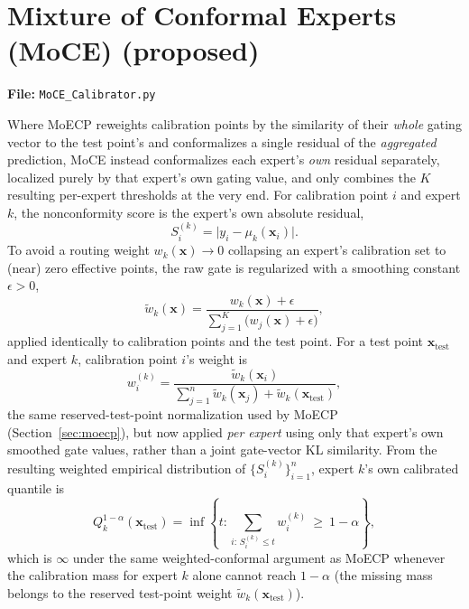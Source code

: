 \documentclass[11pt]{article}
\begin{document}
\section{Mixture of Conformal Experts (MoCE) (proposed)}
\textbf{File:} \texttt{MoCE\_Calibrator.py}

Where MoECP reweights calibration points by the similarity of their \emph{whole} gating vector to
the test point's and conformalizes a single residual of the \emph{aggregated} prediction, MoCE
instead conformalizes each expert's \emph{own} residual separately, localized purely by that
expert's own gating value, and only combines the $K$ resulting per-expert thresholds at the very
end. For calibration point $i$ and expert $k$, the nonconformity score is the expert's own absolute
residual,
\begin{equation}
S_i^{(k)} = \big|y_i - \mu_k(\bm{x}_i)\big|.
\label{eq:moce-score}
\end{equation}
To avoid a routing weight $w_k(\bm{x}) \to 0$ collapsing an expert's calibration set to (near) zero
effective points, the raw gate is regularized with a smoothing constant $\epsilon>0$,
\begin{equation}
\tilde{w}_k(\bm{x}) = \frac{w_k(\bm{x}) + \epsilon}{\sum_{j=1}^{K}\big(w_j(\bm{x})+\epsilon\big)},
\label{eq:moce-smooth}
\end{equation}
applied identically to calibration points and the test point. For a test point
$\bm{x}_{\mathrm{test}}$
and expert $k$, calibration point $i$'s weight is
\begin{equation}
w_i^{(k)} = \frac{\tilde{w}_k(\bm{x}_i)}{\sum_{j=1}^{n} \tilde{w}_k(\bm{x}_j) +
\tilde{w}_k(\bm{x}_{\mathrm{test}})},
\label{eq:moce-weight}
\end{equation}
the same reserved-test-point normalization used by MoECP (Section~\ref{sec:moecp}), but now applied
\emph{per expert} using only that expert's own smoothed gate values, rather than a joint
gate-vector KL similarity. From the resulting weighted empirical distribution of
$\{S_i^{(k)}\}_{i=1}^n$, expert $k$'s own calibrated quantile is
\begin{equation}
Q_k^{1-\alpha}(\bm{x}_{\mathrm{test}}) = \inf\left\{ t : \sum_{i:\, S_i^{(k)} \le t} w_i^{(k)} \
\ge\ 1-\alpha \right\},
\label{eq:moce-quantile}
\end{equation}
which is $\infty$ under the same weighted-conformal argument as MoECP whenever the calibration mass
for expert $k$ alone cannot reach $1-\alpha$ (the missing mass belongs to the reserved test-point
weight $\tilde w_k(\bm x_{\mathrm{test}})$).
\end{document}

